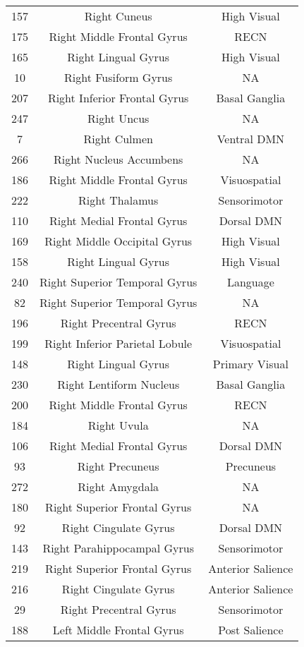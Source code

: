 \documentclass[10pt,letterpaper]{article}\usepackage[]{graphicx}\usepackage[]{color}
\begin{document}
\begin{center}
\begin{longtable}[c]{ccc}
		157	& Right Cuneus & High Visual \\
		175	& Right Middle Frontal Gyrus & RECN \\
		165	& Right Lingual Gyrus & High Visual \\
		10 & Right Fusiform Gyrus & NA \\
		207	& Right Inferior Frontal Gyrus & Basal Ganglia \\
		247	& Right Uncus & NA \\
		7 & Right Culmen & Ventral DMN \\
		266	& Right Nucleus Accumbens & NA \\
		186	& Right Middle Frontal Gyrus & Visuospatial \\
		222	& Right Thalamus & Sensorimotor \\
		110	& Right Medial Frontal Gyrus & Dorsal DMN \\
		169	& Right Middle Occipital Gyrus & High Visual \\
		158	& Right Lingual Gyrus & High Visual \\
		240	& Right Superior Temporal Gyrus	& Language \\
		82 & Right Superior Temporal Gyrus & NA \\
		196	& Right Precentral Gyrus & RECN \\
		199	& Right Inferior Parietal Lobule & Visuospatial \\
		148	& Right Lingual Gyrus & Primary Visual \\
		230	& Right Lentiform Nucleus & Basal Ganglia \\
		200	& Right Middle Frontal Gyrus & RECN \\
		184	& Right Uvula & NA \\
		106	& Right Medial Frontal Gyrus & Dorsal DMN \\
		93 & Right Precuneus & Precuneus \\
		272	& Right Amygdala & NA \\
		180	& Right Superior Frontal Gyrus & NA \\
		92 & Right Cingulate Gyrus & Dorsal DMN \\
		143	& Right Parahippocampal Gyrus & Sensorimotor \\
		219	& Right Superior Frontal Gyrus & Anterior Salience \\
		216	& Right Cingulate Gyrus	& Anterior Salience \\
		29 & Right Precentral Gyrus	& Sensorimotor \\
		188	& Left Middle Frontal Gyrus	& Post Salience \\

\end{longtable}
\end{center}
\end{document}

